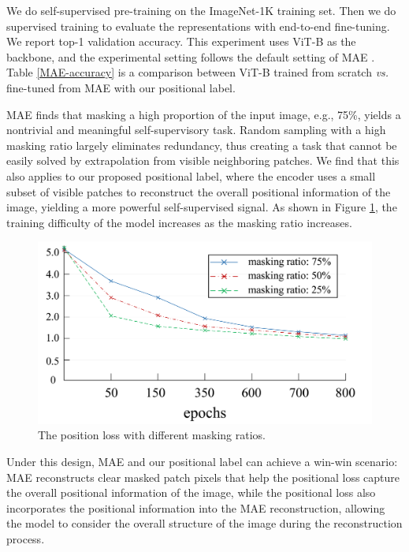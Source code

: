 \documentclass{article}
\begin{document}
We do self-supervised pre-training on the ImageNet-1K training set. Then we do supervised training to evaluate the representations with end-to-end fine-tuning. We report top-1 validation accuracy. This experiment uses ViT-B as the backbone, and the experimental setting follows the default setting of MAE \cite{DBLP:journals/corr/abs-2111-06377}. Table \ref{MAE-accuracy} is a comparison between ViT-B trained from scratch \emph{vs.} ﬁne-tuned from MAE with our positional label.

MAE finds that masking a high proportion of the input image, e.g., 75\%, yields a nontrivial and meaningful self-supervisory task. Random sampling with a high masking ratio largely eliminates redundancy, thus creating a task that cannot be easily solved by extrapolation from visible neighboring patches. We find that this also applies to our proposed positional label, where the encoder uses a small subset of visible patches to reconstruct the overall positional information of the image, yielding a more powerful self-supervised signal. As shown in Figure \ref{MaskRatio-flabel}, the training difficulty of the model increases as the masking ratio increases.

\begin{figure}[h]
  \centering
   \includegraphics[width=0.9\linewidth]{MaskRatio.pdf}
   \caption{The position loss with different masking ratios.}
   \label{MaskRatio-flabel}
\end{figure}

Under this design, MAE and our positional label can achieve a win-win scenario: MAE reconstructs clear masked patch pixels that help the positional loss capture the overall positional information of the image, while the positional loss also incorporates the positional information into the MAE reconstruction, allowing the model to consider the overall structure of the image during the reconstruction process.
\end{document}
